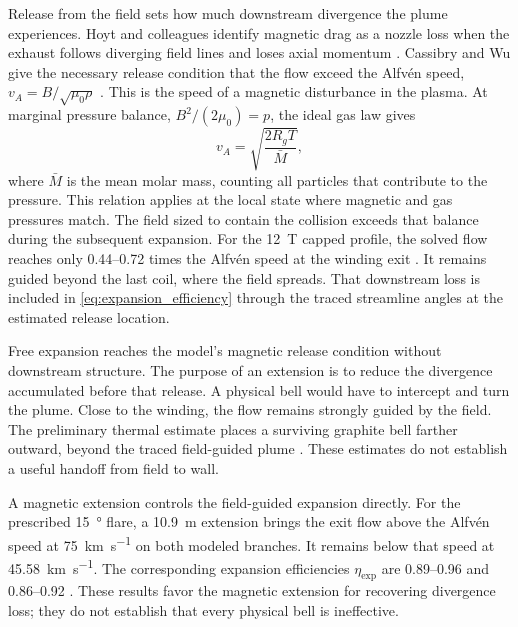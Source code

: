 \documentclass{article}
\begin{document}
Release from the field sets how much downstream divergence the plume experiences. Hoyt and colleagues identify magnetic drag as a nozzle loss when the exhaust follows diverging field lines and loses axial momentum \cite{hoyt1995magnetic_nozzle}. Cassibry and Wu give the necessary release condition that the flow exceed the Alfv\'en speed, $v_A = B/\sqrt{\mu_0\rho}$ \cite{cassibry2007subalfvenic}. This is the speed of a magnetic disturbance in the plasma. At marginal pressure balance, $B^2/(2\mu_0) = p$, the ideal gas law gives
\begin{equation}
v_A = \sqrt{\frac{2R_gT}{\bar{M}}},
\label{eq:alfven_from_standoff}
\end{equation}
where $\bar{M}$ is the mean molar mass, counting all particles that contribute to the pressure. This relation applies at the local state where magnetic and gas pressures match. The field sized to contain the collision exceeds that balance during the subsequent expansion. For the \SI{12}{\tesla} capped profile, the solved flow reaches only \numrange{0.44}{0.72} times the Alfv\'en speed at the winding exit \cite{Katz_puffsat_impact_sim_2026}. It remains guided beyond the last coil, where the field spreads. That downstream loss is included in \autoref{eq:expansion_efficiency} through the traced streamline angles at the estimated release location.

Free expansion reaches the model's magnetic release condition without downstream structure. The purpose of an extension is to reduce the divergence accumulated before that release. A physical bell would have to intercept and turn the plume. Close to the winding, the flow remains strongly guided by the field. The preliminary thermal estimate places a surviving graphite bell farther outward, beyond the traced field-guided plume \cite{Katz_puffsat_impact_sim_2026}. These estimates do not establish a useful handoff from field to wall.

A magnetic extension controls the field-guided expansion directly. For the prescribed \SI{15}{\degree} flare, a \SI{10.9}{\meter} extension brings the exit flow above the Alfv\'en speed at \SI{75}{\kilo\meter\per\second} on both modeled branches. It remains below that speed at \SI{45.58}{\kilo\meter\per\second}. The corresponding expansion efficiencies $\eta_{\mathrm{exp}}$ are \numrange{0.89}{0.96} and \numrange{0.86}{0.92} \cite{Katz_puffsat_impact_sim_2026}. These results favor the magnetic extension for recovering divergence loss; they do not establish that every physical bell is ineffective.
\end{document}
